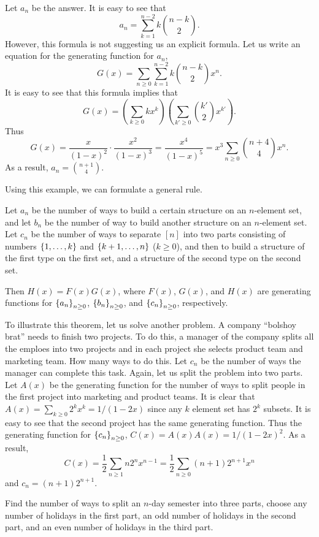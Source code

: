 Let $a_n$ be the answer. It is easy to see that
\[
  a_n = \sum_{k = 1}^{n - 2} k \binom{n - k}{2}.
\]
However, this formula is not suggesting us an explicit formula.
Let us write an equation for the generating function for $a_n$,
\[
  G(x) = \sum_{n \ge 0} \sum_{k = 1}^{n - 2} k \binom{n - k}{2} x^n.
\]
It is easy to see that this formula implies that
\[
  G(x) = \left( \sum_{k \ge 0} k x^k \right)
    \left( \sum_{k' \ge 0} \binom{k'}{2} x^{k'} \right).
\]
Thus
\[
  G(x) = \frac{x}{(1 - x)^2} \cdot \frac{x^2}{(1 - x)^3} =
  \frac{x^4}{(1 - x)^5} = x^3\sum_{n \ge 0} \binom{n + 4}{4} x^n.
\]
As a result, $a_n = \binom{n + 1}{4}$.

Using this example, we can formulate a general rule.
\begin{theorem}
  Let $a_n$ be the number of ways to build a certain structure on an $n$-element
  set, and let $b_n$ be the number of way to build another structure on an
  $n$-element set. Let $c_n$ be the number of ways to separate $[n]$ into two
  parts consisting of numbers $\set{1, \dots, k}$ and $\set{k + 1, \dots, n}$
  ($k \ge 0$), and then to build a structure of the first type on the first set,
  and a structure of the second type on the second set.

  Then $H(x) = F(x)G(x)$, where $F(x)$, $G(x)$, and $H(x)$ are generating
  functions for $\set{a_n}_{n \ge 0}$, $\set{b_n}_{n \ge 0}$, and
  $\set{c_n}_{n \ge 0}$, respectively.
\end{theorem}

To illustrate this theorem, let us solve another problem. A company
``bolshoy brat'' needs to finish two projects. To do this, a manager of the
company splits all the emploes into two projects and in each project she selects
product team and marketing team. How many ways to do this.
Let $c_n$ be the number of ways the manager can complete this task. Again, let
us split the problem into two parts. Let $A(x)$ be the generating function for
the number of ways to split people in the first project into marketing and
product teams. It is clear that $A(x) = \sum_{k \ge 0} 2^k x^k = 1 / (1 - 2x)$
since any $k$ element set has $2^k$ subsets. It is easy to see that the second
project has the same generating function. Thus the generating function for
$\set{c_n}_{n \ge 0}$, $C(x) = A(x) A(x) = 1 / (1 - 2x)^2$.
As a result,
\[
  C(x) = \frac{1}{2} \sum_{n \ge 1} n 2^n x^{n - 1} =
  \frac{1}{2} \sum_{n \ge 0} (n + 1) 2^{n + 1} x^n
\]
and $c_n = (n + 1) 2^{n + 1}$.

\begin{exercise}
  Find the number of ways to split an $n$-day semester into three parts, choose
  any number of holidays in the first part, an odd number of holidays in the
  second part, and an even number of holidays in the third part.
\end{exercise}

